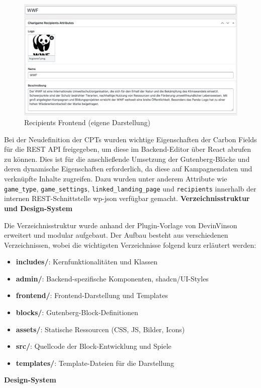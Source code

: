 \begin{figure}[H]
    \centering
    \includegraphics[width=1\textwidth]{images/new_recipients_backend}
    \caption{Recipients Frontend (eigene Darstellung)}
    \label{fig:new-recipients-frontend}
\end{figure}

Bei der Neudefinition der CPTs wurden wichtige Eigenschaften der Carbon Fields für die REST API freigegeben, um diese im Backend-Editor über React abrufen zu können.
Dies ist für die anschließende Umsetzung der Gutenberg-Blöcke und deren dynamische Eigenschaften erforderlich, da diese auf Kampagnendaten und verknüpfte Inhalte zugreifen.
Dazu wurden unter anderem Attribute wie \texttt{game\_type}, \texttt{game\_settings}, \texttt{linked\_landing\_page} und \texttt{recipients} innerhalb der internen REST-Schnittstelle wp-json verfügbar gemacht.
\newpage
\textbf{Verzeichnisstruktur und Design-System}

Die Verzeichnisstruktur wurde anhand der Plugin-Vorlage von DevinVinson erweitert und modular aufgebaut.
Der Aufbau besteht aus verschiedenen Verzeichnissen, wobei die wichtigsten Verzeichnisse folgend kurz erläutert werden:

\begin{itemize}
    \item \textbf{includes/}: Kernfunktionalitäten und Klassen
    \item \textbf{admin/}: Backend-spezifische Komponenten, shadcn/UI-Styles
    \item \textbf{frontend/}: Frontend-Darstellung und Templates
    \item \textbf{blocks/}: Gutenberg-Block-Definitionen
    \item \textbf{assets/}: Statische Ressourcen (CSS, JS, Bilder, Icons)
    \item \textbf{src/}: Quellcode der Block-Entwicklung und Spiele
    \item \textbf{templates/}: Template-Dateien für die Darstellung
\end{itemize}
\vspace{0.5em}
\textbf{Design-System}

